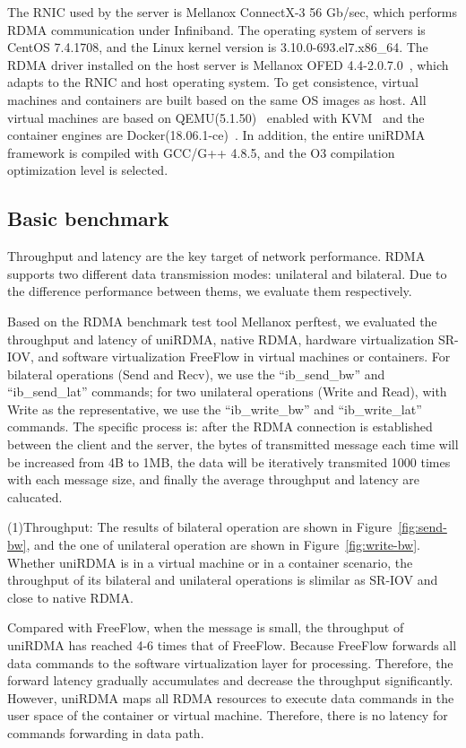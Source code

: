 The RNIC used by the server is Mellanox ConnectX-3 56 Gb/sec, which performs RDMA communication under Infiniband. The operating system of servers is CentOS 7.4.1708, and the Linux kernel version is 3.10.0-693.el7.x86\_64. The RDMA driver installed on the host server is Mellanox OFED 4.4-2.0.7.0~\cite{mlnx-ofed}, which adapts to the RNIC and host operating system. To get consistence, virtual machines and containers are built based on the same OS images as host. All virtual machines are based on QEMU(5.1.50)~\cite{qemu} enabled with KVM~\cite{kvm} and the container engines are Docker(18.06.1-ce)~\cite{docker}. In addition, the entire uniRDMA framework is compiled with GCC/G++ 4.8.5, and the O3 compilation optimization level is selected. 

\subsection{Basic benchmark}
Throughput and latency are the key target of network performance. RDMA supports two different data transmission modes: unilateral and bilateral. Due to the difference performance between thems, we evaluate them respectively.

Based on the RDMA benchmark test tool Mellanox perftest, we evaluated the throughput and latency of uniRDMA, native RDMA, hardware virtualization SR-IOV, and software virtualization FreeFlow in virtual machines or containers. For bilateral operations (Send and Recv), we use the ``ib\_send\_bw'' and ``ib\_send\_lat'' commands; for two unilateral operations (Write and Read), with Write as the representative, we use the ``ib\_write\_bw'' and ``ib\_write\_lat'' commands. The specific process is: after the RDMA connection is established between the client and the server, the bytes of  transmitted message each time will be increased from 4B to 1MB, the data will be iteratively transmited 1000 times with each message size, and finally the average throughput and latency are calucated.

(1)Throughput: The results of bilateral operation are shown in Figure~\ref{fig:send-bw}, and the one of unilateral operation are shown in Figure~\ref{fig:write-bw}. Whether uniRDMA is in a virtual machine or in a container scenario, the throughput of its bilateral and unilateral operations is slimilar as SR-IOV and close to native RDMA.

Compared with FreeFlow, when the message is small, the throughput of uniRDMA has reached 4-6 times that of FreeFlow. Because FreeFlow forwards all data commands to the software virtualization layer for processing. Therefore, the forward latency gradually accumulates and decrease the throughput significantly. However, uniRDMA maps all RDMA resources to execute data commands in the user space of the container or virtual machine. Therefore, there is no latency for  commands forwarding in data path.

